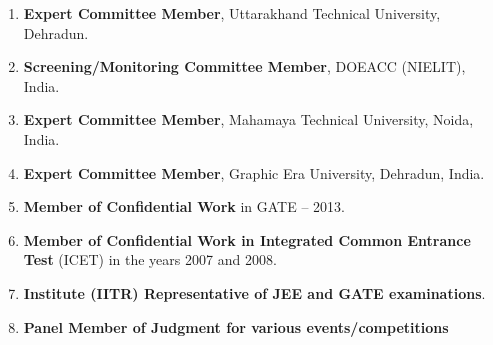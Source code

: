 \begin{enumerate}

\item
\textbf{Expert Committee Member}, Uttarakhand Technical University, Dehradun.

\item
\textbf{Screening/Monitoring Committee Member}, DOEACC (NIELIT), India.

\item
\textbf{Expert Committee Member}, Mahamaya Technical University, Noida, India.

\item 
\textbf{Expert Committee Member}, Graphic Era University, Dehradun, India.

\item
\textbf{Member of Confidential Work} in GATE – 2013. 

\item
\textbf{Member of Confidential Work in Integrated Common Entrance Test} (ICET) in the years 2007 and 2008.

\item
\textbf{Institute (IITR) Representative of JEE and GATE examinations}.

\item
\textbf{Panel Member of Judgment for various events/competitions}

\end{enumerate}






